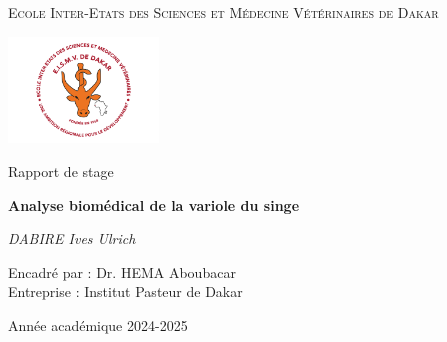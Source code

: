 \begin{titlepage}
    \centering
    \vspace*{2cm}
    
    {\scshape\LARGE Ecole Inter-Etats des Sciences et Médecine Vétérinaires de Dakar \par}
    \vspace{1.5cm}

    \includegraphics[width=0.3\textwidth]{logo_eismv.png}
    \vspace{2cm}

    {\Large Rapport de stage\par}
    \vspace{1cm}

    
    {\Huge\bfseries Analyse biomédical de la variole du singe \par}
    \vspace{1.5cm}
    
    
    {\Large\itshape DABIRE Ives Ulrich \par}
    \vfill

    Encadré par : Dr. HEMA Aboubacar \\
    Entreprise : Institut Pasteur de Dakar \par

    \vspace{1.5cm}

    {\large Année académique 2024-2025\par}
\end{titlepage}
